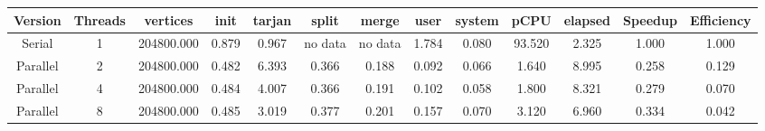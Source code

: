\begin{tabular}{|c|c|c|c|c|c|c|c|c|c|c|c|c|}
\toprule
 Version &  Threads &   vertices &  init &  tarjan &   split &   merge &  user &  system &   pCPU &  elapsed &  Speedup &  Efficiency \\
\midrule
  Serial &        1 & 204800.000 & 0.879 &   0.967 & no data & no data & 1.784 &   0.080 & 93.520 &    2.325 &    1.000 &       1.000 \\
Parallel &        2 & 204800.000 & 0.482 &   6.393 &   0.366 &   0.188 & 0.092 &   0.066 &  1.640 &    8.995 &    0.258 &       0.129 \\
Parallel &        4 & 204800.000 & 0.484 &   4.007 &   0.366 &   0.191 & 0.102 &   0.058 &  1.800 &    8.321 &    0.279 &       0.070 \\
Parallel &        8 & 204800.000 & 0.485 &   3.019 &   0.377 &   0.201 & 0.157 &   0.070 &  3.120 &    6.960 &    0.334 &       0.042 \\
\bottomrule
\end{tabular}
